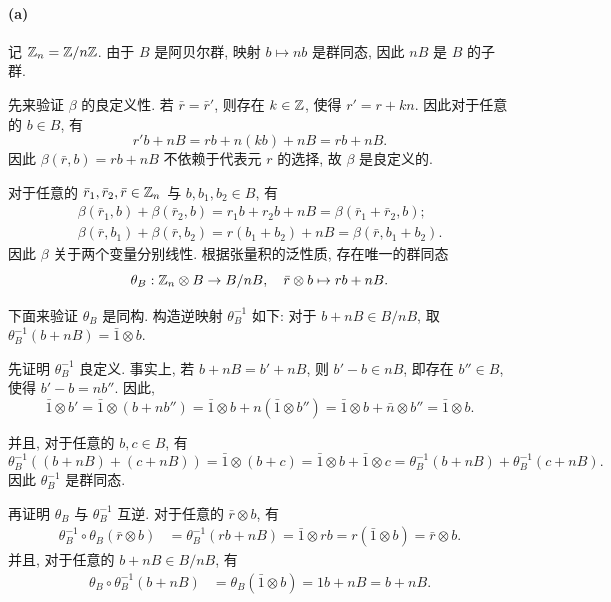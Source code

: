 \documentclass{article}
\begin{document}
\begin{solution}
	\paragraph{(a)} 记 $\mathbb{Z}_n = \mathbb{Z} / n\mathbb{Z}$. 由于 $B$ 是阿贝尔群, 映射 $b \mapsto nb$ 是群同态, 因此 $nB$ 是 $B$ 的子群.

	先来验证 $\beta$ 的良定义性. 若 $\bar{r} = \bar{r}'$, 则存在 $k \in \mathbb{Z}$, 使得 $r' = r + kn$. 因此对于任意的 $b \in B$, 有
	\[ r'b + nB = rb + n(kb) + nB = rb + nB. \]
	因此 $\beta(\bar{r}, b) = rb + nB$ 不依赖于代表元 $r$ 的选择, 故 $\beta$ 是良定义的.

	对于任意的 $\bar{r}_1, \bar{r}_2, \bar{r} \in \mathbb{Z}_n$ 与 $b, b_1, b_2 \in B$, 有
	\begin{gather*}
		\beta(\bar{r}_1, b) + \beta(\bar{r}_2, b) = r_1b + r_2 b + nB = \beta(\bar{r}_1 + \bar{r}_2, b); \\
		\beta(\bar{r}, b_1) + \beta(\bar{r}, b_2) = r(b_1 + b_2) + nB = \beta(\bar{r}, b_1 + b_2).
	\end{gather*}
	因此 $\beta$ 关于两个变量分别线性. 根据张量积的泛性质, 存在唯一的群同态
	\[ \theta_B: \mathbb{Z}_n \otimes B \to B/nB, \quad \bar{r} \otimes b \mapsto rb + nB. \]

	下面来验证 $\theta_B$ 是同构. 构造逆映射 $\theta_B^{-1}$ 如下: 对于 $b + nB \in B/nB$, 取 $\theta_B^{-1}(b + nB) = \bar{1} \otimes b$.

	先证明 $\theta_B^{-1}$ 良定义. 事实上, 若 $b + nB = b' + nB$, 则 $b' - b \in nB$, 即存在 $b'' \in B$, 使得 $b' - b = nb''$. 因此, 
	\[ \bar{1} \otimes b' = \bar{1} \otimes (b + nb'') = \bar{1} \otimes b + n (\bar{1} \otimes b'') = \bar{1} \otimes b + \bar{n} \otimes b'' = \bar{1} \otimes b. \]

	并且, 对于任意的 $b,c \in B$, 有
	\[ \theta_B^{-1}((b+nB)+(c+nB)) = \bar{1} \otimes (b+c) = \bar{1} \otimes b + \bar{1} \otimes c = \theta_B^{-1}(b+nB) + \theta_B^{-1}(c+nB). \]
	因此 $\theta_B^{-1}$ 是群同态.

	再证明 $\theta_B$ 与 $\theta_B^{-1}$ 互逆. 对于任意的 $\bar{r} \otimes b$, 有
	\begin{align*}
		\theta_B^{-1} \circ \theta_B (\bar{r} \otimes b)
		&= \theta_B^{-1} (rb + nB)
		= \bar{1} \otimes rb
		=r(\bar{1} \otimes b)
		= \bar{r} \otimes b.
	\end{align*}
	并且, 对于任意的 $b + nB \in B/nB$, 有
	\begin{align*}
		\theta_B \circ \theta_B^{-1} (b + nB)
		&= \theta_B(\bar{1} \otimes b)
		= 1b + nB = b + nB.
	\end{align*}


\end{solution}
\end{document}
